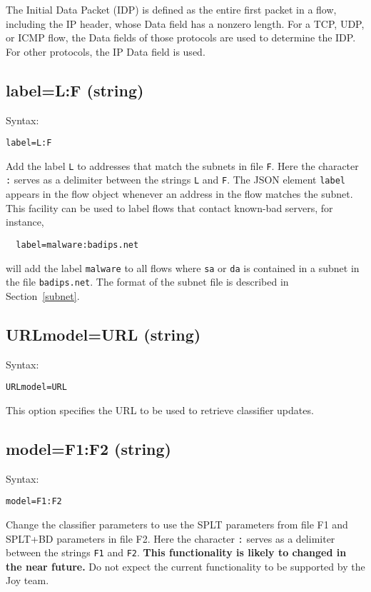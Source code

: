 \documentclass{book}
\begin{document}
The Initial Data Packet (IDP) is defined as the entire first packet in
a flow, including the IP header, whose Data field has a nonzero
length.  For a TCP, UDP, or ICMP flow, the Data fields of those
protocols are used to determine the IDP.   For other protocols,
the IP Data field is used.  

\subsection{label=L:F (string)}
\label{label}
\begin{mdframed}[style=aaa]
Syntax:
  \begin{verbatim}
label=L:F                  
  \end{verbatim}
\end{mdframed}
Add the label \texttt{L} to addresses that match the subnets in file
\texttt{F}.  Here the character \texttt{:} serves as a delimiter
between the strings \texttt{L} and \texttt{F}.  The JSON element
\texttt{label} appears in the flow object whenever an address in the
flow matches the subnet.  This facility can be used to label flows
that contact known-bad servers, for instance,
\begin{verbatim}
  label=malware:badips.net                  
\end{verbatim}
will add the label \texttt{malware} to all flows where \texttt{sa} or
\texttt{da} is contained in a subnet in the file \texttt{badips.net}.
The format of the subnet file is described in Section~\ref{subnet}.

\subsection{URLmodel=URL (string)}
\label{URLmodel}
\begin{mdframed}[style=aaa]
Syntax:
  \begin{verbatim}
URLmodel=URL               
  \end{verbatim}
\end{mdframed}
This option specifies the URL to be used to retrieve classifier
updates.

\subsection{model=F1:F2 (string)}
\label{model}
\begin{mdframed}[style=aaa]
Syntax:
  \begin{verbatim}
model=F1:F2                
  \end{verbatim}
\end{mdframed}
Change the classifier parameters to use the SPLT parameters from file
F1 and SPLT+BD parameters in file F2.  Here the character \texttt{:}
serves as a delimiter between the strings \texttt{F1} and \texttt{F2}.
\textbf{This functionality is likely to changed in the near future.}
Do not expect the current functionality to be supported by the Joy
team.
\end{document}
